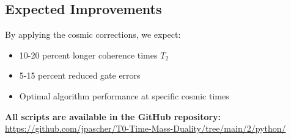 \subsection{Expected Improvements}

By applying the cosmic corrections, we expect:

\begin{itemize}
	\item 10-20 percent longer coherence times $T_2$
	\item 5-15 percent reduced gate errors
	\item Optimal algorithm performance at specific cosmic times
\end{itemize}

\textbf{All scripts are available in the GitHub repository:} \\
\url{https://github.com/jpascher/T0-Time-Mass-Duality/tree/main/2/python/}

